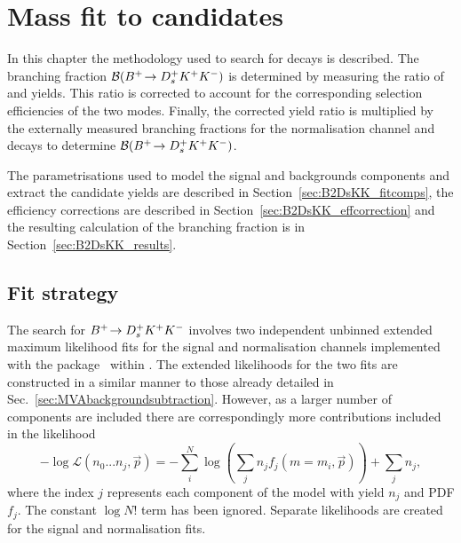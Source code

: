 \chapter{Mass fit to \decay{\Bp}{\Dsp\Kp\Km} candidates} 
\label{ch:B2DsKK}

\minitoc

In this chapter the methodology used to search for \decay{\Bp}{\Dsp\Kp\Km} decays is described.
The branching fraction ${\mathcal{B}}({{{B}^+}}\!\rightarrow {\ensuremath{{D}^+_{s}}}{\ensuremath{{K}^+}}{\ensuremath{{K}^-}})$ is determined by measuring the ratio of \decay{\Bp}{\Dsp\Kp\Km} and \decay{\Bp}{\Dsp\Dzb} yields. 
This ratio is corrected to account for the corresponding selection efficiencies of the two modes. Finally, the corrected yield ratio is multiplied by the externally measured branching fractions for the normalisation channel \decay{\Bp}{\Dsp\Dzb} and \decay{\Dzb}{\Kp\Km} decays to determine ${\mathcal{B}}({{{B}^+}}\!\rightarrow {\ensuremath{{D}^+_{s}}}{\ensuremath{{K}^+}}{\ensuremath{{K}^-}})$.




The parametrisations used to model the signal and backgrounds components and extract the candidate yields are described in Section~\ref{sec:B2DsKK_fitcomps}, the efficiency corrections are described in Section~\ref{sec:B2DsKK_effcorrection} and the resulting calculation of the branching fraction is in Section~\ref{sec:B2DsKK_results}.



\section{Fit strategy}
\label{sec:B2DsKK_fitstrategy}
The search for ${{{B}^+}}\!\rightarrow {\ensuremath{{D}^+_{s}}}{\ensuremath{{K}^+}}{\ensuremath{{K}^-}}$ involves two independent unbinned extended maximum likelihood fits for the signal and normalisation channels implemented with the \roofit package~\cite{Roofit} within \root. The extended likelihoods for the two fits are constructed in a similar manner to those already detailed in Sec.~\ref{sec:MVAbackgroundsubtraction}. However, as a larger number of components are included there are correspondingly more contributions included in the likelihood
\begin{equation}
-\log\mathcal{L}(n_{0}...n_{j},\vec{p}) = -\sum_{i}^{N} \log \left( \sum_{j} n_{j} f_{j}(m=m_{i},\vec{p}) \right) + \sum_{j}n_{j},
\end{equation}
where the index $j$ represents each component of the model with yield $n_{j}$ and PDF $f_{j}$. The constant $\log{N!}$ term has been ignored. Separate likelihoods are created for the signal and normalisation fits.



